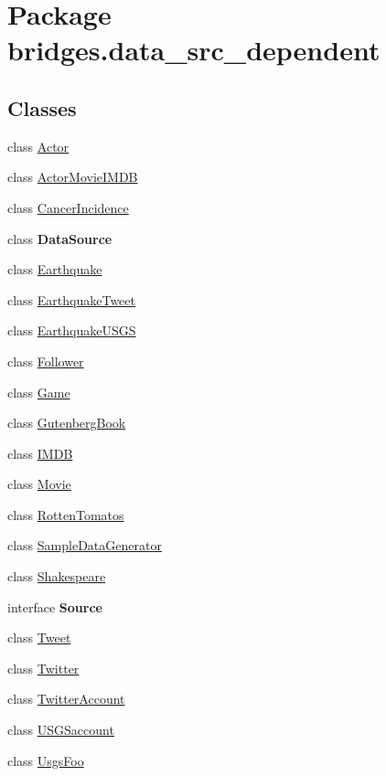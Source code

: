 \hypertarget{namespacebridges_1_1data__src__dependent}{}\section{Package bridges.\+data\+\_\+src\+\_\+dependent}
\label{namespacebridges_1_1data__src__dependent}
\subsection*{Classes}
\begin{DoxyCompactItemize}
\item 
class \hyperlink{classbridges_1_1data__src__dependent_1_1_actor}{Actor}
\item 
class \hyperlink{classbridges_1_1data__src__dependent_1_1_actor_movie_i_m_d_b}{Actor\+Movie\+I\+M\+DB}
\item 
class \hyperlink{classbridges_1_1data__src__dependent_1_1_cancer_incidence}{Cancer\+Incidence}
\item 
class {\bfseries Data\+Source}
\item 
class \hyperlink{classbridges_1_1data__src__dependent_1_1_earthquake}{Earthquake}
\item 
class \hyperlink{classbridges_1_1data__src__dependent_1_1_earthquake_tweet}{Earthquake\+Tweet}
\item 
class \hyperlink{classbridges_1_1data__src__dependent_1_1_earthquake_u_s_g_s}{Earthquake\+U\+S\+GS}
\item 
class \hyperlink{classbridges_1_1data__src__dependent_1_1_follower}{Follower}
\item 
class \hyperlink{classbridges_1_1data__src__dependent_1_1_game}{Game}
\item 
class \hyperlink{classbridges_1_1data__src__dependent_1_1_gutenberg_book}{Gutenberg\+Book}
\item 
class \hyperlink{classbridges_1_1data__src__dependent_1_1_i_m_d_b}{I\+M\+DB}
\item 
class \hyperlink{classbridges_1_1data__src__dependent_1_1_movie}{Movie}
\item 
class \hyperlink{classbridges_1_1data__src__dependent_1_1_rotten_tomatos}{Rotten\+Tomatos}
\item 
class \hyperlink{classbridges_1_1data__src__dependent_1_1_sample_data_generator}{Sample\+Data\+Generator}
\item 
class \hyperlink{classbridges_1_1data__src__dependent_1_1_shakespeare}{Shakespeare}
\item 
interface {\bfseries Source}
\item 
class \hyperlink{classbridges_1_1data__src__dependent_1_1_tweet}{Tweet}
\item 
class \hyperlink{classbridges_1_1data__src__dependent_1_1_twitter}{Twitter}
\item 
class \hyperlink{classbridges_1_1data__src__dependent_1_1_twitter_account}{Twitter\+Account}
\item 
class \hyperlink{classbridges_1_1data__src__dependent_1_1_u_s_g_saccount}{U\+S\+G\+Saccount}
\item 
class \hyperlink{classbridges_1_1data__src__dependent_1_1_usgs_foo}{Usgs\+Foo}
\end{DoxyCompactItemize}
